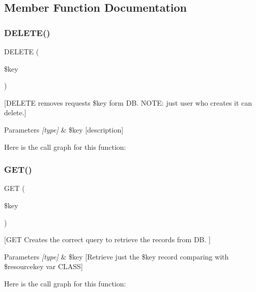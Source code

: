\subsection{Member Function Documentation}
\mbox{\label{class_accessrequest_a10abe19fb01e7c9a2b88104cf8afc666}} 
\subsubsection{\texorpdfstring{D\+E\+L\+E\+T\+E()}{DELETE()}}
{\footnotesize\ttfamily D\+E\+L\+E\+TE (\begin{DoxyParamCaption}\item[{}]{\$key }\end{DoxyParamCaption})}

\mbox{[}D\+E\+L\+E\+TE removes requests \$key form DB. N\+O\+TE\+: just user who creates it can delete.\mbox{]} 
\begin{DoxyParams}{Parameters}
{\em \mbox{[}type\mbox{]}} & \$key \mbox{[}description\mbox{]} \\
\hline
\end{DoxyParams}
Here is the call graph for this function\+:
\mbox{\label{class_accessrequest_a7490aac9922424f1e605adf9cda9a78b}} 
\subsubsection{\texorpdfstring{G\+E\+T()}{GET()}}
{\footnotesize\ttfamily G\+ET (\begin{DoxyParamCaption}\item[{}]{\$key }\end{DoxyParamCaption})}

\mbox{[}G\+ET Creates the correct query to retrieve the records from DB. \mbox{]} 
\begin{DoxyParams}{Parameters}
{\em \mbox{[}type\mbox{]}} & \$key \mbox{[}Retrieve just the \$key record comparing with \$resourcekey var C\+L\+A\+SS\mbox{]} \\
\hline
\end{DoxyParams}
Here is the call graph for this function\+:
\mbox{\label{class_accessrequest_aea3bf4cb6556d5b12c15f871fc0960f6}} 
